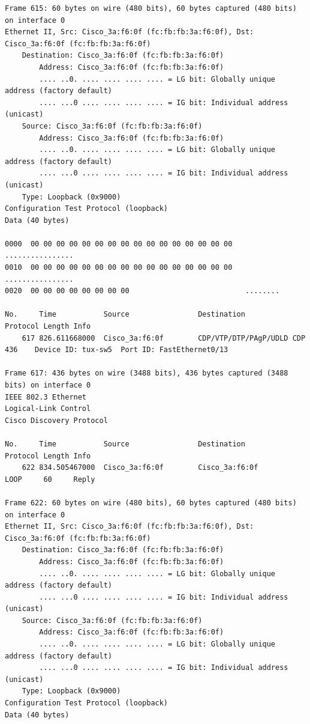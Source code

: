 \documentclass[a4paper,11pt]{article}
\begin{document}
\begin{lstlisting}
Frame 615: 60 bytes on wire (480 bits), 60 bytes captured (480 bits) on interface 0
Ethernet II, Src: Cisco_3a:f6:0f (fc:fb:fb:3a:f6:0f), Dst: Cisco_3a:f6:0f (fc:fb:fb:3a:f6:0f)
    Destination: Cisco_3a:f6:0f (fc:fb:fb:3a:f6:0f)
        Address: Cisco_3a:f6:0f (fc:fb:fb:3a:f6:0f)
        .... ..0. .... .... .... .... = LG bit: Globally unique address (factory default)
        .... ...0 .... .... .... .... = IG bit: Individual address (unicast)
    Source: Cisco_3a:f6:0f (fc:fb:fb:3a:f6:0f)
        Address: Cisco_3a:f6:0f (fc:fb:fb:3a:f6:0f)
        .... ..0. .... .... .... .... = LG bit: Globally unique address (factory default)
        .... ...0 .... .... .... .... = IG bit: Individual address (unicast)
    Type: Loopback (0x9000)
Configuration Test Protocol (loopback)
Data (40 bytes)

0000  00 00 00 00 00 00 00 00 00 00 00 00 00 00 00 00   ................
0010  00 00 00 00 00 00 00 00 00 00 00 00 00 00 00 00   ................
0020  00 00 00 00 00 00 00 00                           ........

No.     Time           Source                Destination           Protocol Length Info
    617 826.611668000  Cisco_3a:f6:0f        CDP/VTP/DTP/PAgP/UDLD CDP      436    Device ID: tux-sw5  Port ID: FastEthernet0/13  

Frame 617: 436 bytes on wire (3488 bits), 436 bytes captured (3488 bits) on interface 0
IEEE 802.3 Ethernet 
Logical-Link Control
Cisco Discovery Protocol

No.     Time           Source                Destination           Protocol Length Info
    622 834.505467000  Cisco_3a:f6:0f        Cisco_3a:f6:0f        LOOP     60     Reply

Frame 622: 60 bytes on wire (480 bits), 60 bytes captured (480 bits) on interface 0
Ethernet II, Src: Cisco_3a:f6:0f (fc:fb:fb:3a:f6:0f), Dst: Cisco_3a:f6:0f (fc:fb:fb:3a:f6:0f)
    Destination: Cisco_3a:f6:0f (fc:fb:fb:3a:f6:0f)
        Address: Cisco_3a:f6:0f (fc:fb:fb:3a:f6:0f)
        .... ..0. .... .... .... .... = LG bit: Globally unique address (factory default)
        .... ...0 .... .... .... .... = IG bit: Individual address (unicast)
    Source: Cisco_3a:f6:0f (fc:fb:fb:3a:f6:0f)
        Address: Cisco_3a:f6:0f (fc:fb:fb:3a:f6:0f)
        .... ..0. .... .... .... .... = LG bit: Globally unique address (factory default)
        .... ...0 .... .... .... .... = IG bit: Individual address (unicast)
    Type: Loopback (0x9000)
Configuration Test Protocol (loopback)
Data (40 bytes)


\end{lstlisting}
\end{document}
